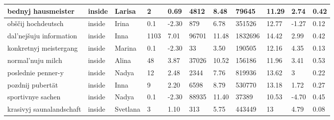 \begin{longtable}{|p{3cm}|p{1cm}|p{1cm}|R{0.8cm}|R{0.8cm}|R{1.2cm}|R{1cm}|R{1.3cm}|R{1cm}|R{0.8cm}|R{0.6cm}|}
bednyj hausmeister                                                 & inside      & Larisa    & 2                   & 0.69                      & 4812       & 8.48             & 79645        & 11.29                 & 2.74  & 0.42                 \\ \hline
ob\v{s}\v{c}ij hochdeutsch                                         & inside      & Irina     & 0.1                 & -2.30                     & 879        & 6.78             & 351526       & 12.77                 & -1.27 & 0.12                 \\ \hline
dal'nej\v{s}uju information                                        & inside      & Inna      & 1103                & 7.01                      & 96701      & 11.48            & 1832696      & 14.42                 & 2.99  & 0.42                 \\ \hline
konkretnyj meistergang                                             & inside      & Marina    & 0.1                 & -2.30                     & 33         & 3.50             & 190505       & 12.16                 & 4.35  & 0.13                 \\ \hline
normal'nuju milch                                                  & inside      & Alina     & 48                  & 3.87                      & 37026      & 10.52            & 156186       & 11.96                 & 3.41  & 0.53                 \\ \hline
poslednie penner-y                                                 & inside      & Nadya     & 12                  & 2.48                      & 2344       & 7.76             & 819936       & 13.62                 & 3  & 0.22                 \\ \hline
pozdnij pubert\"{a}t                                               & inside      & Inna      & 9                   & 2.20                      & 6598       & 8.79             & 530770       & 13.18                 & 1.72  & 0.27                 \\ \hline
sportivnye sachen                                                  & inside      & Nadya     & 0.1                 & -2.30                     & 88935      & 11.40            & 37389        & 10.53                 & -4.70 & 0.45                 \\ \hline
krasivyj saunalandschaft                                           & inside      & Svetlana  & 3                   & 1.10                      & 313        & 5.75             & 443449       & 13                 & 4.79  & 0.08                 \\ \hline

\end{longtable}
